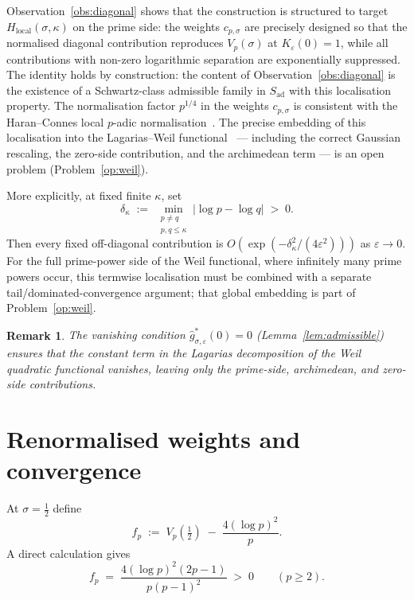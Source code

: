 \documentclass[11pt]{article}
\newtheorem*{remark}{Remark}
\newcommand{\Hlocal}{H_{\mathrm{local}}}
\newcommand{\Sad}{S_{\mathrm{ad}}}
\begin{document}
Observation~\ref{obs:diagonal} shows that the construction is
structured to target $\Hlocal(\sigma,\kappa)$ on the prime side:
the weights $c_{p,\sigma}$ are precisely designed so that the
normalised diagonal contribution reproduces $V_p(\sigma)$ at
$K_\varepsilon(0)=1$, while all contributions with non-zero logarithmic
separation are exponentially suppressed.
The identity holds by construction: the content of
Observation~\ref{obs:diagonal} is the existence of a
Schwartz-class admissible family in $\Sad$ with this
localisation property.
The normalisation factor $p^{1/4}$ in the weights
$c_{p,\sigma}$ is consistent with the Haran--Connes
local $p$-adic normalisation~\cite{Haran01,Connes}.
The precise embedding of this localisation into the
Lagarias--Weil functional~\cite{Lagarias} --- including the
correct Gaussian rescaling, the zero-side contribution, and the
archimedean term --- is an open problem (Problem~\ref{op:weil}).

More explicitly, at fixed finite $\kappa$, set
\[
\delta_\kappa
\;:=\; \min_{\substack{p\ne q \\ p,q\le\kappa}}
|\log p - \log q| \;>\; 0.
\]
Then every fixed off-diagonal contribution is
$O(\exp(-\delta_\kappa^2/(4\varepsilon^2)))$
as $\varepsilon\to 0$.
For the full prime-power side of the Weil functional, where
infinitely many prime powers occur, this termwise localisation
must be combined with a separate tail/dominated-convergence
argument; that global embedding is part of
Problem~\ref{op:weil}.

\begin{remark}
The vanishing condition $\widehat g^*_{\sigma,\varepsilon}(0)=0$
(Lemma~\ref{lem:admissible}) ensures that the constant term in
the Lagarias decomposition of the Weil quadratic functional
vanishes, leaving only the prime-side, archimedean, and zero-side
contributions.
\end{remark}

\section{Renormalised weights and convergence}
\label{sec:renorm}

At $\sigma=\tfrac12$ define
\[
f_p \;:=\; V_p(\tfrac12) \;-\; \frac{4(\log p)^2}{p}.
\]
A direct calculation gives
\begin{equation}\label{eq:fp}
f_p \;=\; \frac{4(\log p)^2(2p-1)}{p(p-1)^2} \;>\; 0
\qquad (p\ge 2).
\end{equation}
\end{document}
